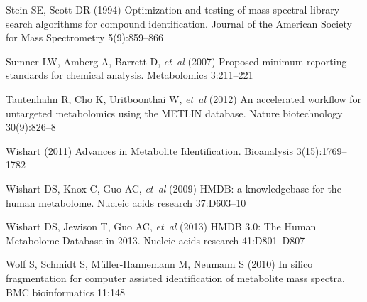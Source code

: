 \begin{thebibliography}{38}
Stein SE, Scott DR (1994) {Optimization and testing of mass spectral library
  search algorithms for compound identification}. Journal of the American
  Society for Mass Spectrometry 5(9):859--866

Sumner LW, Amberg A, Barrett D, \emph{et~al}
  (2007) {Proposed minimum reporting standards for chemical analysis}.
  Metabolomics 3:211--221

Tautenhahn R, Cho K, Uritboonthai W, \emph{et~al} (2012) {An
  accelerated workflow for untargeted metabolomics using the METLIN database}.
  Nature biotechnology 30(9):826--8

Wishart (2011) {Advances in Metabolite Identification}. Bioanalysis
  3(15):1769--1782

Wishart DS, Knox C, Guo AC, \emph{et~al}
  (2009) {HMDB: a knowledgebase for the human metabolome.} Nucleic acids
  research 37:D603--10

Wishart DS, Jewison T, Guo AC, \emph{et~al} (2013) {HMDB 3.0: The Human Metabolome Database in 2013}. Nucleic
  acids research 41:D801--D807

Wolf S, Schmidt S, M\"{u}ller-Hannemann M, Neumann S (2010) {In silico
  fragmentation for computer assisted identification of metabolite mass
  spectra.} BMC bioinformatics 11:148

\end{thebibliography}





